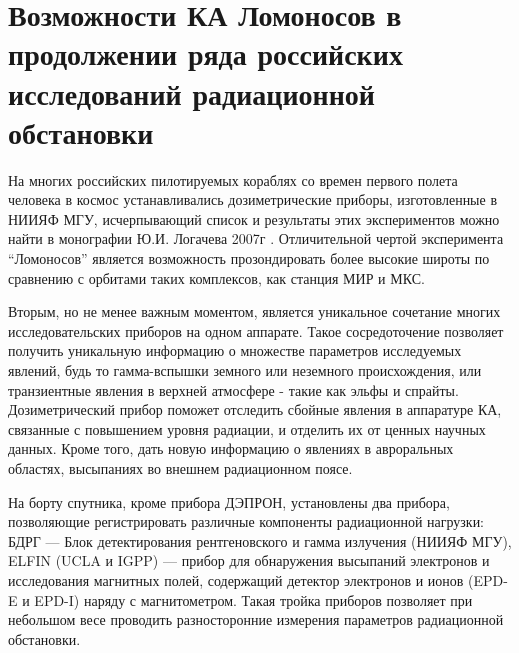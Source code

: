 \section{Возможности КА Ломоносов в продолжении ряда российских исследований радиационной обстановки}

На многих российских пилотируемых кораблях со времен первого полета человека в космос устанавливались дозиметрические приборы, изготовленные в НИИЯФ МГУ, исчерпывающий список и результаты этих экспериментов можно найти в монографии Ю.И. Логачева 2007г \cite{logachev2007}. Отличительной чертой эксперимента ``Ломоносов'' является возможность прозондировать более высокие широты по сравнению с орбитами таких комплексов, как станция МИР и МКС. 

Вторым, но не менее важным моментом, является уникальное сочетание многих исследовательских приборов на одном аппарате. Такое сосредоточение позволяет получить уникальную информацию о множестве параметров исследуемых явлений, будь то гамма-вспышки земного или неземного происхождения, или транзиентные явления в верхней атмосфере - такие как эльфы и спрайты. Дозиметрический прибор поможет отследить сбойные явления в аппаратуре КА, связанные с повышением уровня радиации, и отделить их от ценных научных данных. Кроме того, дать новую информацию о явлениях в авроральных областях, высыпаниях во внешнем радиационном поясе.

На борту спутника, кроме прибора ДЭПРОН, установлены два прибора, позволяющие регистрировать различные компоненты радиационной нагрузки: БДРГ --- Блок детектирования рентгеновского и гамма излучения (НИИЯФ МГУ), ELFIN (UCLA и IGPP) --- прибор для обнаружения высыпаний электронов и исследования магнитных полей, содержащий детектор электронов и ионов (EPD-E и EPD-I) наряду с магнитометром. Такая тройка приборов позволяет при небольшом весе проводить разносторонние измерения параметров радиационной обстановки.



